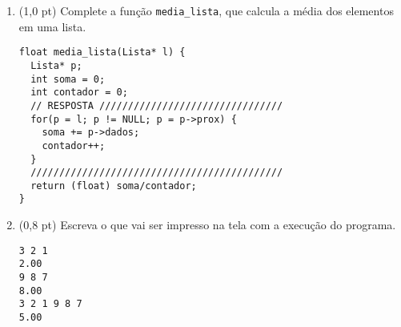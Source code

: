 \documentclass[a4paper,10pt]{article}
\begin{document}
\begin{multicols*}{2}
\begin{enumerate}
\begin{enumerate}
    \item (1,0 pt) Complete a função \texttt{media\_lista}, que calcula a média dos elementos em uma lista.

    \begin{verbatim}
float media_lista(Lista* l) {
  Lista* p;
  int soma = 0;
  int contador = 0;
  // RESPOSTA ////////////////////////////////
  for(p = l; p != NULL; p = p->prox) {
    soma += p->dados;
    contador++;
  }
  ////////////////////////////////////////////
  return (float) soma/contador;
}
    \end{verbatim}

    \item (0,8 pt) Escreva o que vai ser impresso na tela com a execução do programa.

    \begin{verbatim}
3 2 1
2.00
9 8 7
8.00
3 2 1 9 8 7
5.00
    \end{verbatim}
  \end{enumerate}
\end{enumerate}
\end{multicols*}
\end{document}
